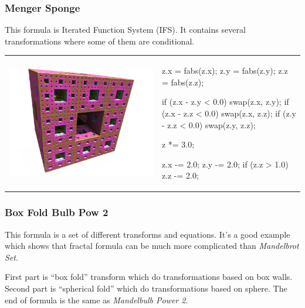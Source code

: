 \subsubsection{Menger Sponge} \nopagebreak

This formula is Iterated Function System (IFS). It contains several
transformations where some of them are conditional. \nopagebreak

\begin{tabular}{l l}
	\includegraphics[width=0.3\linewidth]{img/manual/media/formula_menger_sponge.png}	
	& 
	\begin{minipage}[b]{0.5\linewidth}
		\begin{cppcode}
z.x = fabs(z.x);
z.y = fabs(z.y);
z.z = fabs(z.z);
		
if (z.x - z.y < 0.0) swap(z.x, z.y);
if (z.x - z.z < 0.0) swap(z.x, z.z);
if (z.y - z.z < 0.0) swap(z.y, z.z);
		
z *= 3.0;
		
z.x -= 2.0;
z.y -= 2.0;
if (z.z > 1.0) z.z -= 2.0;
		\end{cppcode}
	\end{minipage}
\end{tabular} 

\subsubsection{Box Fold Bulb Pow 2}
\nopagebreak

This formula is a set of different transforms and equations. It's a good example
which shows that fractal formula can be much more complicated than
\emph{Mandelbrot Set}.

First part is ``box fold'' transform which do
transformations based on box walls. Second part is ``spherical
fold'' which do transformations based on sphere.
The end of formula is the same as \emph{Mandelbulb Power 2}. \nopagebreak

